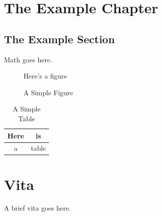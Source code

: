 \documentclass[final]{ukthesis}
\begin{document}
%
%
%
\chapter{The Example Chapter}
\section{The Example Section}
Math goes here.
\begin{figure}[h]
\centering
Here's a figure
\caption{A Simple Figure}
\end{figure}
\begin{table}[h]
\centering
\begin{tabular}{c|c}
Here & is \\
\hline
a & table
\end{tabular}
\caption{A Simple Table}
\end{table}
\copyrightnotice
\backmatter

\chapter{Vita}
A brief vita goes here.
\end{document}
